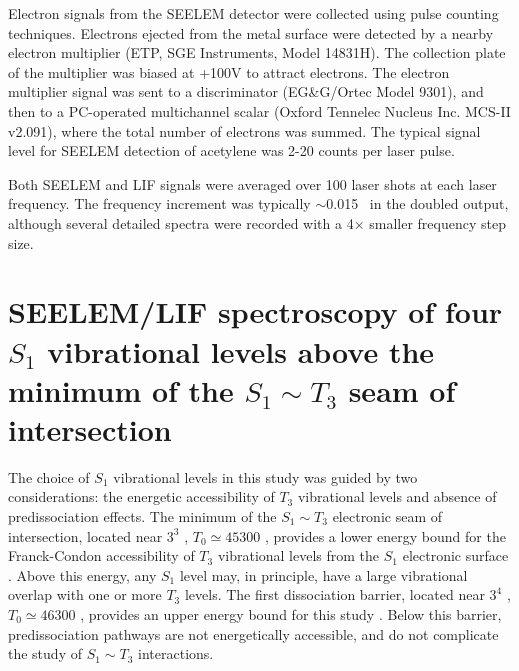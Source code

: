 \documentclass[12pt]{mitthesis}
\begin{document}
Electron signals from the SEELEM detector were collected using pulse
counting techniques.  Electrons ejected from the metal surface were
detected by a nearby electron multiplier (ETP, SGE Instruments, Model
14831H).  The collection plate of the multiplier was biased at +100V
to attract electrons.  The electron multiplier signal was sent to a
discriminator (EG\&G/Ortec Model 9301), and then to a PC-operated
multichannel scalar (Oxford Tennelec Nucleus Inc. MCS-II v2.091),
where the total number of electrons was summed.  The typical signal
level for SEELEM detection of acetylene was 2-20 counts per laser
pulse.

Both SEELEM and LIF signals were averaged over 100 laser shots at each
laser frequency.  The frequency increment was typically $\sim$0.015
\rcm\ in the doubled output, although several detailed spectra were
recorded with a 4$\times$ smaller frequency step size.





























\section{SEELEM/LIF spectroscopy of four $S_1$ vibrational levels
  above the minimum of the $S_1 \sim T_3$ seam of intersection}


The choice of $S_1$ vibrational levels in this study was guided by two
considerations: the energetic accessibility of $T_3$ vibrational
levels \cite{cui97, thom07} and absence of predissociation effects.
The minimum of the $S_1 \sim T_3$ electronic seam of intersection,
located near $3^3$ , $T_0 \simeq 45300$ \rcm, provides a lower
energy bound for the Franck-Condon accessibility of $T_3$ vibrational
levels from the $S_1$ electronic surface \cite{cui97}.  Above this
energy, any $S_1$ level may, in principle, have a large vibrational
overlap with one or more $T_3$ levels.  The first dissociation
barrier, located near $3^4$ , $T_0 \simeq 46300$ \rcm, provides
an upper energy bound for this study \cite{mordaunt98}.  Below this
barrier, predissociation pathways are not energetically accessible,
and do not complicate the study of $S_1 \sim T_3$ interactions.
\end{document}
